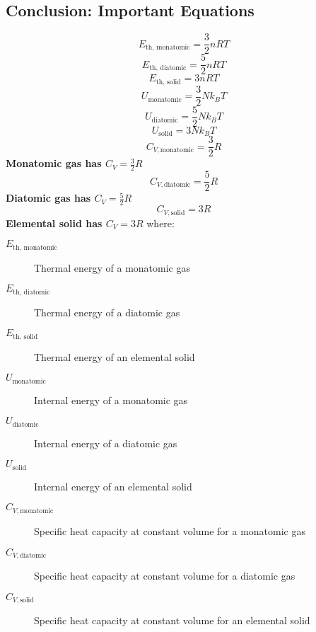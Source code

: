 \documentclass{article}
\begin{document}
\subsection*{Conclusion: Important Equations}
\begin{equation}
E_{\text{th, monatomic}} = \frac{3}{2} nRT
\end{equation}
\begin{equation}
E_{\text{th, diatomic}} = \frac{5}{2} nRT
\end{equation}
\begin{equation}
E_{\text{th, solid}} = 3nRT
\end{equation}
\begin{equation}
U_{\text{monatomic}} = \frac{3}{2} Nk_B T
\end{equation}
\begin{equation}
U_{\text{diatomic}} = \frac{5}{2} Nk_B T
\end{equation}
\begin{equation}
U_{\text{solid}} = 3Nk_B T
\end{equation}
\begin{equation}
C_{V, \text{monatomic}} = \frac{3}{2}R
\end{equation}
\textbf{Monatomic gas has \( C_V = \frac{3}{2}R \)}
\begin{equation}
C_{V, \text{diatomic}} = \frac{5}{2}R
\end{equation}
\textbf{Diatomic gas has \( C_V = \frac{5}{2}R \)}
\begin{equation}
C_{V, \text{solid}} = 3R
\end{equation}
\textbf{Elemental solid has \( C_V = 3R \)}
where:
\begin{description}
    \item[$E_{\text{th, monatomic}}$] Thermal energy of a monatomic gas
    \item[$E_{\text{th, diatomic}}$] Thermal energy of a diatomic gas
    \item[$E_{\text{th, solid}}$] Thermal energy of an elemental solid
    \item[$U_{\text{monatomic}}$] Internal energy of a monatomic gas
    \item[$U_{\text{diatomic}}$] Internal energy of a diatomic gas
    \item[$U_{\text{solid}}$] Internal energy of an elemental solid
    \item[$C_{V, \text{monatomic}}$] Specific heat capacity at constant volume for a monatomic gas
    \item[$C_{V, \text{diatomic}}$] Specific heat capacity at constant volume for a diatomic gas
    \item[$C_{V, \text{solid}}$] Specific heat capacity at constant volume for an elemental solid
\end{description}
\end{document}

